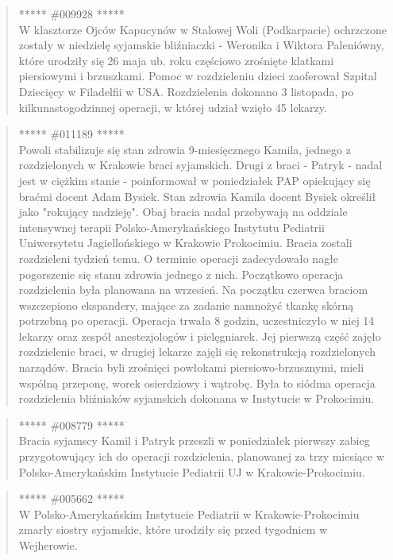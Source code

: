 \documentclass[11pt,a4paper]{article}
\begin{document}
\begin{quote} ***** \#009928 *****\\ W klasztorze Ojców Kapucynów w Stalowej Woli
(Podkarpacie) ochrzczone zostały w niedzielę syjamskie bliźniaczki - Weronika i
Wiktora Paleniówny, które urodziły się 26 maja ub. roku częściowo zrośnięte
klatkami piersiowymi i brzuszkami. Pomoc w rozdzieleniu dzieci zaoferował
Szpital Dziecięcy w Filadelfii w USA.  Rozdzielenia dokonano 3 listopada, po
kilkunastogodzinnej operacji, w której udział wzięło 45 lekarzy.  \end{quote}

\begin{quote} ***** \#011189 *****\\ Powoli stabilizuje się stan zdrowia
9-miesięcznego Kamila, jednego z rozdzielonych w Krakowie braci syjamskich.
Drugi z braci - Patryk - nadal jest w ciężkim stanie - poinformował w
poniedziałek PAP opiekujący się braćmi docent Adam Bysiek.  Stan zdrowia Kamila
docent Bysiek określił jako "rokujący nadzieję". Obaj bracia nadal przebywają
na oddziale intensywnej terapii Polsko-Amerykańskiego Instytutu Pediatrii
Uniwersytetu Jagiellońskiego w Krakowie Prokocimiu.  Bracia zostali rozdzieleni
tydzień temu. O terminie operacji zadecydowało nagłe pogorszenie się stanu
zdrowia jednego z nich.  Początkowo operacja rozdzielenia była planowana na
wrzesień. Na początku czerwca braciom wszczepiono ekspandery, mające za zadanie
namnożyć tkankę skórną potrzebną po operacji.  Operacja trwała 8 godzin,
uczestniczyło w niej 14 lekarzy oraz zespół anestezjologów i pielęgniarek. Jej
pierwszą część zajęło rozdzielenie braci, w drugiej lekarze zajęli się
rekonstrukcją rozdzielonych narządów. Bracia byli zrośnięci powłokami
piersiowo-brzusznymi, mieli wspólną przeponę, worek osierdziowy i wątrobę.
Była to siódma operacja rozdzielenia bliźniaków syjamskich dokonana w
Instytucie w Prokocimiu.  \end{quote}

\begin{quote} ***** \#008779 *****\\ Bracia syjamscy Kamil i Patryk przeszli w
poniedziałek pierwszy zabieg przygotowujący ich do operacji rozdzielenia,
planowanej za trzy miesiące w Polsko-Amerykańskim  Instytucie Pediatrii UJ w
Krakowie-Prokocimiu.  \end{quote}

\begin{quote} ***** \#005662 *****\\ W Polsko-Amerykańskim Instytucie Pediatrii w
Krakowie-Prokocimiu zmarły siostry syjamskie, które urodziły się przed
tygodniem w Wejherowie.  \end{quote}
\end{document}
